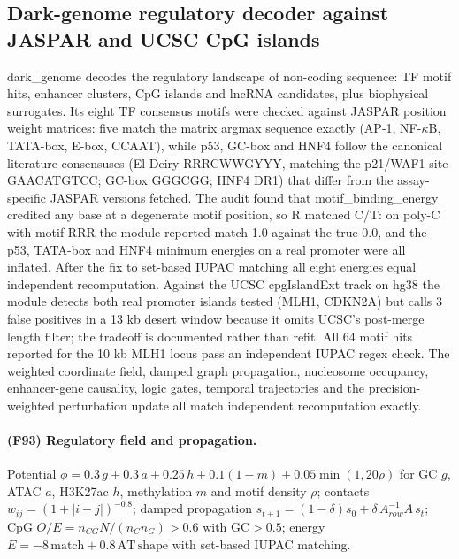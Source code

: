 \subsection{Dark-genome regulatory decoder against JASPAR and UCSC CpG islands}
dark\_genome decodes the regulatory landscape of non-coding sequence: TF motif hits, enhancer clusters, CpG islands and lncRNA candidates, plus biophysical surrogates. Its eight TF consensus motifs were checked against JASPAR position weight matrices: five match the matrix argmax sequence exactly (AP-1, NF-$\kappa$B, TATA-box, E-box, CCAAT), while p53, GC-box and HNF4 follow the canonical literature consensuses (El-Deiry RRRCWWGYYY, matching the p21/WAF1 site GAACATGTCC; GC-box GGGCGG; HNF4 DR1) that differ from the assay-specific JASPAR versions fetched. The audit found that motif\_binding\_energy credited any base at a degenerate motif position, so R matched C/T: on poly-C with motif RRR the module reported match 1.0 against the true 0.0, and the p53, TATA-box and HNF4 minimum energies on a real promoter were all inflated. After the fix to set-based IUPAC matching all eight energies equal independent recomputation. Against the UCSC cpgIslandExt track on hg38 the module detects both real promoter islands tested (MLH1, CDKN2A) but calls 3 false positives in a 13 kb desert window because it omits UCSC's post-merge length filter; the tradeoff is documented rather than refit. All 64 motif hits reported for the 10 kb MLH1 locus pass an independent IUPAC regex check. The weighted coordinate field, damped graph propagation, nucleosome occupancy, enhancer-gene causality, logic gates, temporal trajectories and the precision-weighted perturbation update all match independent recomputation exactly.
\paragraph{(F93) Regulatory field and propagation.} Potential $\phi=0.3\,g+0.3\,a+0.25\,h+0.1(1-m)+0.05\min(1,20\rho)$ for GC $g$, ATAC $a$, H3K27ac $h$, methylation $m$ and motif density $\rho$; contacts $w_{ij}=(1+|i-j|)^{-0.8}$; damped propagation $s_{t+1}=(1-\delta)s_0+\delta\,A_{row}^{-1}A\,s_t$; CpG $O/E=n_{CG}N/(n_C n_G)>0.6$ with GC$>0.5$; energy $E=-8\,\mathrm{match}+0.8\,\mathrm{AT\,shape}$ with set-based IUPAC matching.
